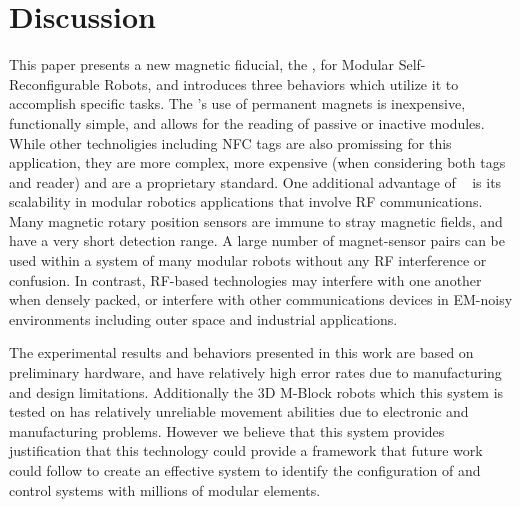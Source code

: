 \section{Discussion}
\label{sec:Discussion}
This paper presents a new magnetic fiducial, the \tagName, for Modular Self-Reconfigurable Robots, and introduces three behaviors which utilize it to accomplish specific tasks.
The \tagNamePlural's use of permanent magnets is inexpensive, functionally simple, and allows for the reading of passive or inactive modules. While other technoligies including NFC tags are also promissing for this application, they are more complex, more expensive (when considering both tags and reader) and are a proprietary standard. %
One additional advantage of \tagName~ is its scalability in modular robotics applications that involve RF communications. Many magnetic rotary position sensors are immune to stray magnetic fields, and have a very short detection range. A large number of magnet-sensor pairs can be used within a system of many modular robots without any RF interference or confusion. In contrast, RF-based technologies may interfere with one another when densely packed, or interfere with other communications devices in EM-noisy environments including outer space and industrial applications.

The experimental results and behaviors presented in this work are based on preliminary hardware, and have relatively high error rates due to manufacturing and design limitations. Additionally the 3D M-Block robots which this system is tested on has relatively unreliable movement abilities due to electronic and manufacturing problems. However we believe that this system provides justification that this technology could provide a framework that future work could follow to create an effective system to identify the configuration of and control systems with millions of modular elements.

